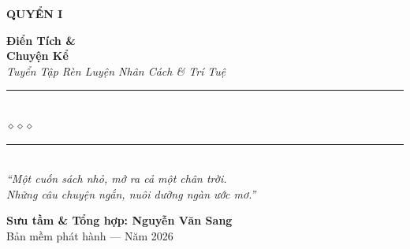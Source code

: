 \begin{titlepage}
\begin{center}
  \begin{tcolorbox}[
    width=6.5cm,
    colback=truyengold!20,
    colframe=truyengold!80!black,
    arc=4pt,
    boxrule=1.5pt,
    halign=center
  ]
    {\fontsize{18}{22}\selectfont\bfseries\color{truyenred!80!black}
     QUYỂN I}
  \end{tcolorbox}
  \vspace{0.8cm}

  {\fontsize{42}{50}\selectfont\bfseries\color{truyenred!80!black}
    Điển Tích \&}\\[0.4cm]
  {\fontsize{38}{45}\selectfont\bfseries\color{truyenred!80!black}
    Chuyện Kể}\\[0.8cm]

  {\fontsize{18}{22}\selectfont\color{truyengold!90!black}\itshape
    Tuyển Tập Rèn Luyện Nhân Cách \& Trí Tuệ}\\[1cm]

  {\color{truyenblue!60}\rule{6cm}{1pt}}\\[5pt]
  {\color{truyengold!80!black}\large$\diamond$\hspace{1cm}$\diamond$\hspace{1cm}$\diamond$}\\[5pt]
  {\color{truyenblue!60}\rule{6cm}{1pt}}\\[1.5cm]

  {\normalsize\itshape\color{truyenblue!90!black}
   ``Một cuốn sách nhỏ, mở ra cả một chân trời.\\
   Những câu chuyện ngắn, nuôi dưỡng ngàn ước mơ.''}

  \vfill

  {\fontsize{16}{20}\selectfont\bfseries\color{truyenblue!90!black}
    Sưu tầm \& Tổng hợp: \textbf{Nguyễn Văn Sang}}\\[0.4cm]
  
  {\small\color{gray} Bản mềm phát hành --- Năm 2026}\\[0.5cm]
\end{center}

\afterpage{\nopagecolor}
\end{titlepage}
